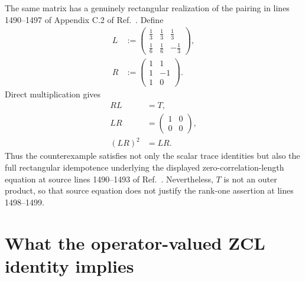 \documentclass{article}
\begin{document}
The same matrix has a genuinely rectangular realization of the pairing in
lines 1490--1497 of Appendix C.2 of
Ref.~\cite{Cirac2016MPDO_arXiv}. Define
\begin{align}
    L
        &:=
        \begin{pmatrix}
            \tfrac13&\tfrac13&\tfrac13\\
            \tfrac16&\tfrac16&-\tfrac13
        \end{pmatrix},
    \label{eq:cpgsv17_rectangular_left_matrix}\\
    R
        &:=
        \begin{pmatrix}
            1&1\\
            1&-1\\
            1&0
        \end{pmatrix}.
    \label{eq:cpgsv17_rectangular_right_matrix}
\end{align}
Direct multiplication gives
\begin{align}
    RL
        &= T,
    \label{eq:cpgsv17_rectangular_product_trace_matrix}\\
    LR
        &=
        \begin{pmatrix}
            1&0\\
            0&0
        \end{pmatrix},
    \label{eq:cpgsv17_rectangular_product_projection}\\
    (LR)^2
        &= LR.
    \label{eq:cpgsv17_rectangular_idempotence}
\end{align}
Thus the counterexample satisfies not only the scalar trace identities but
also the full rectangular idempotence underlying the displayed
zero-correlation-length equation at source lines 1490--1493 of
Ref.~\cite{Cirac2016MPDO_arXiv}. Nevertheless, $T$ is not an outer product, so
that source equation does not justify the rank-one assertion at lines
1498--1499.

\section{What the operator-valued ZCL identity implies}
\label{sec:cpgsv17_operator_zcl}
\end{document}
